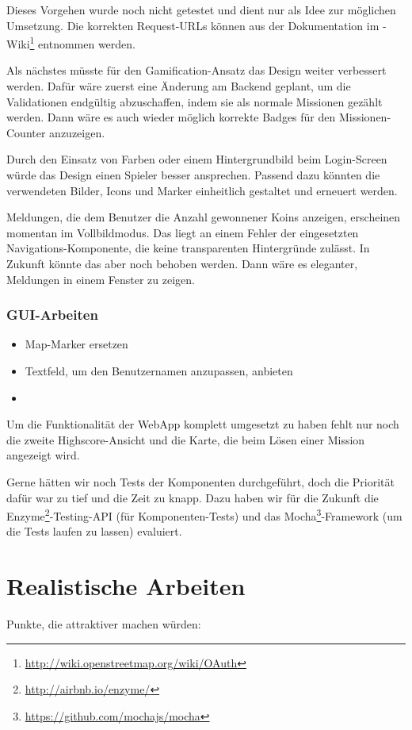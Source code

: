 Dieses Vorgehen wurde noch nicht getestet und dient nur als Idee zur möglichen Umsetzung.
Die korrekten Request-URLs können aus der Dokumentation im -Wiki\footnote{\url{http://wiki.openstreetmap.org/wiki/OAuth}} entnommen werden.

Als nächstes müsste für den \gls{Gamification}-Ansatz das Design weiter verbessert werden. 
Dafür wäre zuerst eine Änderung am Backend geplant, um die Validationen endgültig abzuschaffen, indem sie als normale Missionen gezählt werden. 
Dann wäre es auch wieder möglich korrekte Badges für den Missionen-Counter anzuzeigen. 

Durch den Einsatz von Farben oder einem Hintergrundbild beim Login-Screen würde das Design einen Spieler besser ansprechen. 
Passend dazu könnten die verwendeten Bilder, Icons und Marker einheitlich gestaltet und erneuert werden. 

Meldungen, die dem Benutzer die Anzahl gewonnener Koins anzeigen, erscheinen momentan im Vollbildmodus. 
Das liegt an einem Fehler der eingesetzten Navigations-Komponente, die keine transparenten Hintergründe zulässt. 
In Zukunft könnte das aber noch behoben werden. 
Dann wäre es eleganter, Meldungen in einem Fenster zu zeigen.

\subsubsection{GUI-Arbeiten}
\begin{itemize}
	\item Map-Marker ersetzen
	\item Textfeld, um den Benutzernamen anzupassen, anbieten
	\item 
\end{itemize}

Um die Funktionalität der \gls{WebApp} komplett umgesetzt zu haben fehlt nur noch die zweite Highscore-Ansicht und die Karte, die beim Lösen einer Mission angezeigt wird.

Gerne hätten wir noch Tests der Komponenten durchgeführt, doch die Priorität dafür war zu tief und die Zeit zu knapp. 
Dazu haben wir für die Zukunft die Enzyme\footnote{\url{http://airbnb.io/enzyme/}}-Testing-API (für Komponenten-Tests) und das Mocha\footnote{\url{https://github.com/mochajs/mocha}}-\gls{Framework} (um die Tests laufen zu lassen) evaluiert.

\section{Realistische Arbeiten}
\label{pd-weiterentwicklung-realistisch}
Punkte, die \kort{} attraktiver machen würden:

